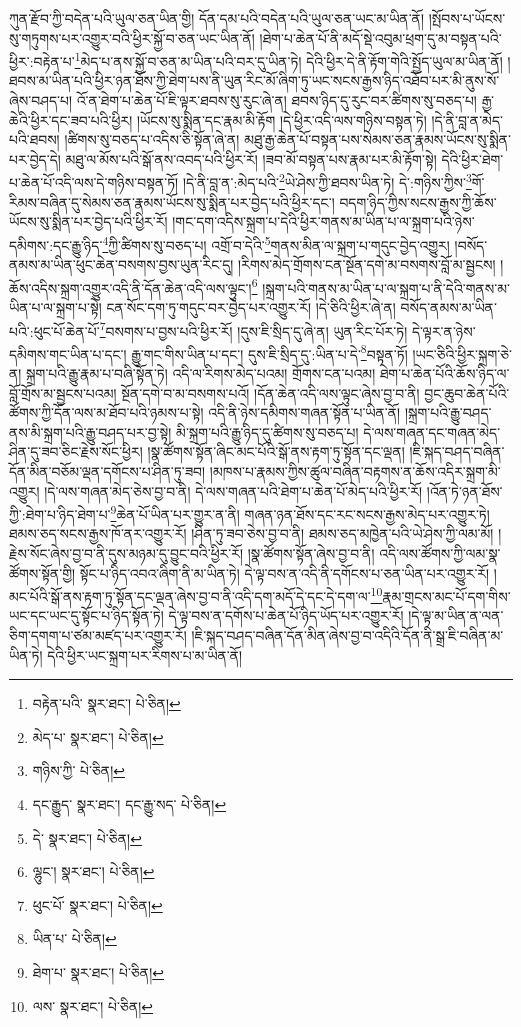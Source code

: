 ཀུན་རྫོབ་ཀྱི་བདེན་པའི་ཡུལ་ཅན་ཡིན་གྱི། དོན་དམ་པའི་བདེན་པའི་ཡུལ་ཅན་ཡང་མ་ཡིན་ནོ། །སྤོབས་པ་ཡོངས་སུ་གཏུགས་པར་འགྱུར་བའི་ཕྱིར་སྐྱོ་བ་ཅན་ཡང་ཡིན་ནོ། །ཐེག་པ་ཆེན་པོ་ནི་མདོ་སྡེ་འབུམ་ཕྲག་དུ་མ་བསྟན་པའི་ཕྱིར་:བརྟེན་པ་\footnote{བརྟེན་པའི་  སྣར་ཐང་།  པེ་ཅིན། }མེད་པ་ནས་སྐྱོ་བ་ཅན་མ་ཡིན་པའི་བར་དུ་ཡིན་ཏེ། དེའི་ཕྱིར་དེ་ནི་རྟོག་གེའི་སྤྱོད་ཡུལ་མ་ཡིན་ནོ། །ཐབས་མ་ཡིན་པའི་ཕྱིར་ཉན་ཐོས་ཀྱི་ཐེག་པས་ནི་ཡུན་རིང་མོ་ཞིག་ཏུ་ཡང་སངས་རྒྱས་ཉིད་འཐོབ་པར་མི་ནུས་སོ་ཞེས་བཤད་པ། འོ་ན་ཐེག་པ་ཆེན་པོ་ཇི་ལྟར་ཐབས་སུ་རུང་ཞེ་ན། ཐབས་ཉིད་དུ་རུང་བར་ཚིགས་སུ་བཅད་པ། རྒྱ་ཆེའི་ཕྱིར་དང་ཟབ་པའི་ཕྱིར། །ཡོངས་སུ་སྨིན་དང་རྣམ་མི་རྟོག །དེ་ཕྱིར་འདི་ལས་གཉིས་བསྟན་ཏེ། །དེ་ནི་བླ་ན་མེད་པའི་ཐབས། །ཚིགས་སུ་བཅད་པ་འདིས་ཅི་སྟོན་ཞེ་ན། མཐུ་རྒྱ་ཆེན་པོ་བསྟན་པས་སེམས་ཅན་རྣམས་ཡོངས་སུ་སྨིན་པར་བྱེད་དེ། མཐུ་ལ་མོས་པའི་སྒོ་ནས་འབད་པའི་ཕྱིར་རོ། །ཟབ་མོ་བསྟན་པས་རྣམ་པར་མི་རྟོག་སྟེ། དེའི་ཕྱིར་ཐེག་པ་ཆེན་པོ་འདི་ལས་དེ་གཉིས་བསྟན་ཏོ། །དེ་ནི་བླ་ན་:མེད་པའི་\footnote{མེད་པ་  སྣར་ཐང་།  པེ་ཅིན། }ཡེ་ཤེས་ཀྱི་ཐབས་ཡིན་ཏེ། དེ་:གཉིས་ཀྱིས་\footnote{གཉིས་ཀྱི་  པེ་ཅིན། }གོ་རིམས་བཞིན་དུ་སེམས་ཅན་རྣམས་ཡོངས་སུ་སྨིན་པར་བྱེད་པའི་ཕྱིར་དང་། བདག་ཉིད་ཀྱིས་སངས་རྒྱས་ཀྱི་ཆོས་ཡོངས་སུ་སྨིན་པར་བྱེད་པའི་ཕྱིར་རོ། །གང་དག་འདིས་སྐྲག་པ་དེའི་ཕྱིར་གནས་མ་ཡིན་པ་ལ་སྐྲག་པའི་ཉེས་དམིགས་:དང་རྒྱུ་ཉིད་\footnote{དང་རྒྱུད་  སྣར་ཐང་། དང་རྒྱུ་སད་  པེ་ཅིན། }ཀྱི་ཚིགས་སུ་བཅད་པ། འགྲོ་བ་དེའི་\footnote{དེ་  སྣར་ཐང་།  པེ་ཅིན། }གནས་མིན་ལ་སྐྲག་པ་གདུང་བྱེད་འགྱུར། །བསོད་ནམས་མ་ཡིན་ཕུང་ཆེན་བསགས་བྱས་ཡུན་རིང་དུ། །རིགས་མེད་གྲོགས་ངན་སྔོན་དགེ་མ་བསགས་བློ་མ་སྦྱངས། །ཆོས་འདིས་སྐྲག་འགྱུར་འདི་ནི་དོན་ཆེན་འདི་ལས་ལྟུང་།\footnote{ལྷུང་།  སྣར་ཐང་།  པེ་ཅིན། } །སྐྲག་པའི་གནས་མ་ཡིན་པ་ལ་སྐྲག་པ་ནི་དེའི་གནས་མ་ཡིན་པ་ལ་སྐྲག་པ་སྟེ། ངན་སོང་དག་ཏུ་གདུང་བར་བྱེད་པར་འགྱུར་རོ། །དེ་ཅིའི་ཕྱིར་ཞེ་ན། བསོད་ནམས་མ་ཡིན་པའི་:ཕུང་པོ་ཆེན་པོ་\footnote{ཕུང་པོ་  སྣར་ཐང་།  པེ་ཅིན། }བསགས་པ་བྱས་པའི་ཕྱིར་རོ། །དུས་ཇི་སྲིད་དུ་ཞེ་ན། ཡུན་རིང་པོར་ཏེ། དེ་ལྟར་ན་ཉེས་དམིགས་གང་ཡིན་པ་དང་། རྒྱུ་གང་གིས་ཡིན་པ་དང་། དུས་ཇི་སྲིད་དུ་:ཡིན་པ་དེ་\footnote{ཡིན་པ་  པེ་ཅིན། }བསྟན་ཏོ། །ཡང་ཅིའི་ཕྱིར་སྐྲག་ཅེ་ན། སྐྲག་པའི་རྒྱུ་རྣམ་པ་བཞི་སྟོན་ཏེ། འདི་ལ་རིགས་མེད་པའམ། གྲོགས་ངན་པའམ། ཐེག་པ་ཆེན་པོའི་ཆོས་ཉིད་ལ་བློ་གྲོས་མ་སྦྱངས་པའམ། སྔོན་དགེ་བ་མ་བསགས་པའོ། །དོན་ཆེན་འདི་ལས་ལྟུང་ཞེས་བྱ་བ་ནི། བྱང་ཆུབ་ཆེན་པོའི་ཚོགས་ཀྱི་དོན་ལས་མ་ཐོབ་པའི་ཉམས་པ་སྟེ། འདི་ནི་ཉེས་དམིགས་གཞན་སྟོན་པ་ཡིན་ནོ། །སྐྲག་པའི་རྒྱུ་བཤད་ནས་མི་སྐྲག་པའི་རྒྱུ་བཤད་པར་བྱ་སྟེ། མི་སྐྲག་པའི་རྒྱུ་ཉིད་དུ་ཚིགས་སུ་བཅད་པ། དེ་ལས་གཞན་དང་གཞན་མེད་ཤིན་དུ་ཟབ་ཅིང་རྗེས་སོང་ཕྱིར། །སྣ་ཚོགས་སྟོན་ཞིང་མང་པོའི་སྒོ་ནས་རྟག་ཏུ་སྟོན་དང་ལྡན། །ཇི་སྐད་བཤད་བཞིན་དོན་མིན་བཅོམ་ལྡན་དགོངས་པ་ཤིན་ཏུ་ཟབ། །མཁས་པ་རྣམས་ཀྱིས་ཚུལ་བཞིན་བརྟགས་ན་ཆོས་འདིར་སྐྲག་མི་འགྱུར། །དེ་ལས་གཞན་མེད་ཅེས་བྱ་བ་ནི། དེ་ལས་གཞན་པའི་ཐེག་པ་ཆེན་པོ་མེད་པའི་ཕྱིར་རོ། །འོན་ཏེ་ཉན་ཐོས་ཀྱི་:ཐེག་པ་ཉིད་ཐེག་པ་\footnote{ཐེག་པ་  སྣར་ཐང་།  པེ་ཅིན། }ཆེན་པོ་ཡིན་པར་གྱུར་ན་ནི། གཞན་ཉན་ཐོས་དང་རང་སངས་རྒྱས་མེད་པར་འགྱུར་ཏེ། ཐམས་ཅད་སངས་རྒྱས་ཁོ་ནར་འགྱུར་རོ། །ཤིན་ཏུ་ཟབ་ཅེས་བྱ་བ་ནི། ཐམས་ཅད་མཁྱེན་པའི་ཡེ་ཤེས་ཀྱི་ལམ་མོ། །རྗེས་སོང་ཞེས་བྱ་བ་ནི་དུས་མཉམ་དུ་བྱུང་བའི་ཕྱིར་རོ། །སྣ་ཚོགས་སྟོན་ཞེས་བྱ་བ་ནི། འདི་ལས་ཚོགས་ཀྱི་ལམ་སྣ་ཚོགས་སྟོན་གྱི། སྟོང་པ་ཉིད་འབའ་ཞིག་ནི་མ་ཡིན་ཏེ། དེ་ལྟ་བས་ན་འདི་ནི་དགོངས་པ་ཅན་ཡིན་པར་འགྱུར་རོ། །མང་པོའི་སྒོ་ནས་རྟག་ཏུ་སྟོན་དང་ལྡན་ཞེས་བྱ་བ་ནི་འདི་དག་མདོ་དེ་དང་དེ་དག་ལ་\footnote{ལས་  སྣར་ཐང་།  པེ་ཅིན། }རྣམ་གྲངས་མང་པོ་དག་གིས་ཡང་དང་ཡང་དུ་སྟོང་པ་ཉིད་སྟོན་ཏེ། དེ་ལྟ་བས་ན་དགོས་པ་ཆེན་པོ་ཉིད་ཡོད་པར་འགྱུར་རོ། །དེ་ལྟ་མ་ཡིན་ན་ལན་ཅིག་དགག་པ་ཙམ་མཛད་པར་འགྱུར་རོ། །ཇི་སྐད་བཤད་བཞིན་དོན་མིན་ཞེས་བྱ་བ་འདིའི་དོན་ནི་སྒྲ་ཇི་བཞིན་མ་ཡིན་ཏེ། དེའི་ཕྱིར་ཡང་སྐྲག་པར་རིགས་པ་མ་ཡིན་ནོ། 